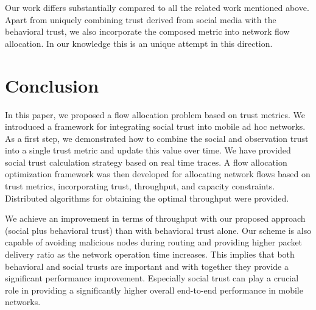 \documentclass[conference]{IEEEtran}
\begin{document}
Our work  differs substantially compared to all the related work mentioned above. Apart from uniquely combining trust derived from social media with the behavioral trust, we also incorporate the composed metric into network flow allocation. In our knowledge this is an unique attempt in this direction.



\section{Conclusion}
\label{sec:conclusion}
In this paper, we proposed a flow allocation problem based on trust metrics. We introduced a framework for integrating social trust into mobile ad hoc networks. As a first step, we demonstrated how to combine the social and observation trust into a single trust metric and update this value over time. We have provided social trust calculation strategy based on real time traces.  A flow allocation optimization framework was then developed for allocating network flows based on trust metrics, incorporating trust, throughput, and capacity constraints.  Distributed algorithms for obtaining the optimal throughput were provided.

 We achieve an improvement in terms of throughput with our proposed approach (social plus behavioral trust) than with behavioral trust alone. Our scheme is also capable of avoiding malicious nodes during routing and providing higher packet delivery ratio as the network operation time increases.  This implies that both behavioral and social trusts are important and with together they provide a significant performance improvement. Especially social trust can play a crucial role in providing a significantly higher overall end-to-end performance in mobile networks.







\end{document}

